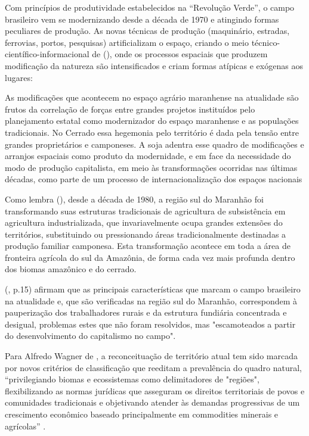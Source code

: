 Com princípios de produtividade estabelecidos na “Revolução Verde”, o campo brasileiro vem se modernizando desde a década de 1970 e atingindo formas peculiares de produção. As novas técnicas de produção (maquinário, estradas, ferrovias, portos, pesquisas) artificializam o espaço, criando o meio técnico-científico-informacional de  (\citeyear{santos1996}), onde os processos espaciais que produzem modificação da natureza são intensificados e criam formas atípicas e exógenas aos lugares:

\begin{citacao}
As modificações que acontecem no espaço agrário maranhense na atualidade são frutos da correlação de forças entre grandes projetos instituídos pelo planejamento estatal como modernizador do espaço maranhense e as populações tradicionais. No Cerrado essa hegemonia pelo território é dada pela tensão entre grandes proprietários e camponeses. A soja adentra esse quadro de modificações e arranjos espaciais como produto da 
modernidade, e em face da necessidade do modo de produção capitalista, em meio às transformações ocorridas nas últimas décadas, como parte de um processo de internacionalização dos espaços nacionais  \cite[p. 3]{rodrigues_alencar}
\end{citacao}

Como lembra  (\citeyear{studte2008}), desde a década de 1980, a região sul do Maranhão foi transformando suas estruturas tradicionais de agricultura de subsistência em agricultura industrializada, que invariavelmente ocupa grandes extensões do territórios, substituindo ou pressionando áreas tradicionalmente destinadas a produção familiar camponesa. Esta transformação acontece em toda a área de fronteira agrícola do sul da Amazônia, de forma cada vez mais profunda dentro dos biomas amazônico e do cerrado.

 (\citeyear{lima_locatel_silva}, p.15) afirmam que as principais características que marcam o campo brasileiro na atualidade e, que são verificadas na região sul do Maranhão, correspondem à pauperização dos trabalhadores rurais e da estrutura fundiária concentrada e desigual, problemas estes que não foram resolvidos, mas "escamoteados a partir do desenvolvimento do capitalismo no campo".

Para Alfredo Wagner de , a reconceituação de território atual tem sido marcada por novos critérios de classificação que reeditam a prevalência do quadro natural, “privilegiando biomas e ecossistemas como delimitadores de "regiões", flexibilizando as normas jurídicas que asseguram os direitos territoriais de povos e comunidades tradicionais e objetivando atender às demandas progressivas de um crescimento econômico baseado principalmente em commodities minerais e agrícolas” \cite{almeida}.

